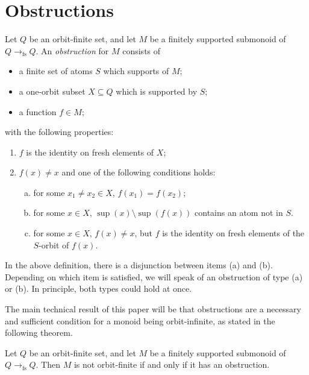 \section{Obstructions}
\label{sec:obstructions}

\newcommand{\fsfun}{\underset {\text{fs}} \longrightarrow}
\newcommand{\smallfsfun}{\to_{\text{fs}}}
\begin{definition}[Obstruction]
    Let $Q$ be an orbit-finite set, and let $M$ be a finitely supported  submonoid of $Q \smallfsfun Q$.
    An \emph{obstruction} for $M$ consists of 
    \begin{itemize}
        \item a finite set of atoms $S$ which supports of $M$;
        \item a one-orbit subset $X \subseteq Q$ which is supported by $S$;
        \item a function $f \in M$;
    \end{itemize}
    with the following properties:
    \begin{enumerate}
        \item $f$ is the identity on fresh elements  of  $X$;
        \item $f(x) \neq x$ and one of the following conditions holds: 
        \begin{enumerate}[(a)]
            \item for some $x_1 \neq x_2 \in X$, $f(x_1) = f(x_2)$;
            \item for some $x \in X$,  $\sup(x) \setminus \sup(f(x))$ contains an atom not in $S$.
            \item for some $x \in X$, $f(x) \neq x$, but $f$ is the identity on fresh elements of the $S$-orbit of $f(x)$.
        \end{enumerate}
    \end{enumerate}
\end{definition}


In the above definition, there is a disjunction between items (a) and (b). Depending on which item is satisfied, we will speak of an obstruction of type (a) or (b). In principle, both types could hold at once.

The main technical result of this paper will be that obstructions are a necessary and sufficient condition for a monoid being orbit-infinite, as stated in the following theorem. 


\begin{theorem}\label{thm:obstructions-sound-and-complete}
    Let $Q$ be an orbit-finite set, and let $M$ be a finitely supported submonoid of $Q \smallfsfun Q$.
    Then $M$ is not orbit-finite if and only if it has an obstruction.
\end{theorem}

